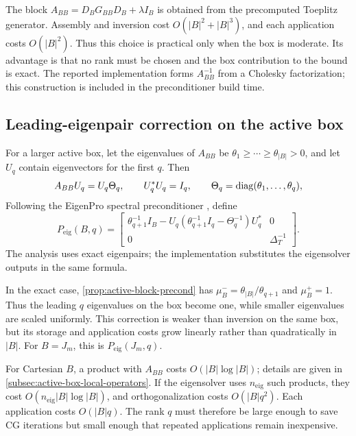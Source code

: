 \noindent
The block \(A_{BB}=D_BG_{BB}D_B+\lambda I_B\) is obtained from the
precomputed Toeplitz generator. Assembly and inversion cost
\(O(|B|^2+|B|^3)\), and each application costs \(O(|B|^2)\). Thus this choice
is practical only when the box is moderate. Its advantage is that no rank must
be chosen and the box contribution to the bound is exact.
The reported implementation forms \(A_{BB}^{-1}\) from a Cholesky
factorization; this construction is included in the preconditioner build time.


\subsection{Leading-eigenpair correction on the active box}
\label{subsec:eigenpro-active-box-preconditioner}

For a larger active box, let the eigenvalues of \(A_{BB}\) be
\(\theta_1\geq\cdots\geq\theta_{|B|}>0\), and let \(U_q\) contain
eigenvectors for the first \(q\). Then
\[
    A_{BB}U_q = U_q\Theta_q,
    \qquad
    U_q^*U_q=I_q,
    \qquad
    \Theta_q=\operatorname{diag}(\theta_1,\ldots,\theta_q),
\]
Following the EigenPro spectral preconditioner
\cite{ma2017eigenpro,abedsoltan2023toward}, define
\[
    P_{\mathrm{eig}}(B,q)
    =
    \begin{bmatrix}
        \theta_{q+1}^{-1}I_B
        -U_q(\theta_{q+1}^{-1}I_q-\Theta_q^{-1})U_q^*
        & 0\\
        0 & \Delta_T^{-1}
    \end{bmatrix}.
\]
The analysis uses exact eigenpairs; the implementation substitutes the
eigensolver outputs in the same formula.

In the exact case, \cref{prop:active-block-precond} has
\(\mu_B^-=\theta_{|B|}/\theta_{q+1}\) and \(\mu_B^+=1\). Thus the leading
\(q\) eigenvalues on the box become one, while smaller eigenvalues are scaled
uniformly. This correction is weaker than inversion on the same box, but its
storage and application costs grow linearly rather than quadratically in
\(|B|\). For \(B=J_m\), this is \(P_{\mathrm{eig}}(J_m,q)\).

\noindent
For Cartesian \(B\), a product with \(A_{BB}\) costs
\(O(|B|\log|B|)\); details are given in
\cref{subsec:active-box-local-operators}.
If the eigensolver uses \(n_{\mathrm{eig}}\) such products, they cost
\(O(n_{\mathrm{eig}}|B|\log|B|)\), and orthogonalization costs
\(O(|B|q^2)\). Each application costs
\(O(|B|q)\). The rank \(q\) must therefore be large enough to save CG
iterations but small enough that repeated applications remain inexpensive.



